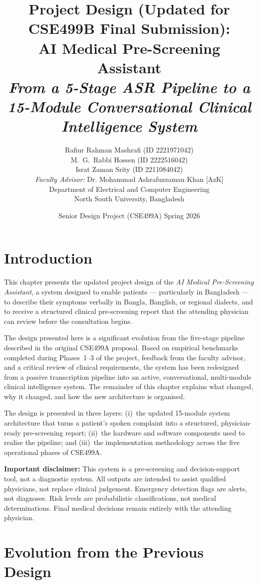 \documentclass[12pt,a4paper]{article}
\title{\bfseries Project Design (Updated for CSE499B Final Submission):\\
AI Medical Pre-Screening Assistant\\
\large\normalfont\textit{From a 5-Stage ASR Pipeline to a 15-Module
Conversational Clinical Intelligence System}}
\author{Rafiur Rahman Mashrafi (ID 2221971042)\\
        M.~G.~Rabbi Hossen (ID 2222516042)\\
        Israt Zaman Srity (ID 2211084042)\\[6pt]
        \emph{Faculty Advisor:} Dr. Mohammad Ashrafuzzaman Khan [AzK]\\
        Department of Electrical and Computer Engineering\\
        North South University, Bangladesh}
\date{Senior Design Project (CSE499A) \quad Spring 2026}
\begin{document}
\maketitle
\tableofcontents
\newpage

\section{Introduction}

This chapter presents the updated project design of the
\textit{AI Medical Pre-Screening Assistant}, a system designed to enable
patients --- particularly in Bangladesh --- to describe their symptoms
verbally in Bangla, Banglish, or regional dialects, and to receive a
structured clinical pre-screening report that the attending physician
can review before the consultation begins.

The design presented here is a significant evolution from the
five-stage pipeline described in the original CSE499A proposal. Based
on empirical benchmarks completed during Phases~1--3 of the project,
feedback from the faculty advisor, and a critical review of clinical
requirements, the system has been redesigned from a passive transcription
pipeline into an active, conversational, multi-module clinical
intelligence system. The remainder of this chapter explains what changed,
why it changed, and how the new architecture is organised.

The design is presented in three layers: (i)~the updated 15-module
system architecture that turns a patient's spoken complaint into a
structured, physician-ready pre-screening report; (ii)~the hardware and
software components used to realise the pipeline; and (iii)~the
implementation methodology across the five operational phases of
CSE499A.

\textbf{Important disclaimer:} This system is a pre-screening and
decision-support tool, not a diagnostic system. All outputs are intended
to assist qualified physicians, not replace clinical judgement. Emergency
detection flags are alerts, not diagnoses. Risk levels are probabilistic
classifications, not medical determinations. Final medical decisions
remain entirely with the attending physician.

\section{Evolution from the Previous Design}
\label{sec:evolution}
\end{document}
